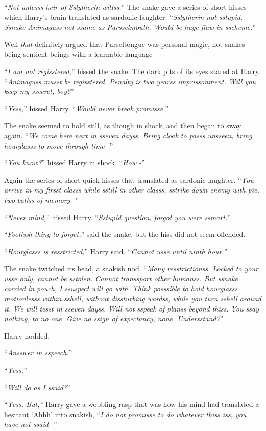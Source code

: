 ``\emph{Not unlesss heir of Sslytherin willss.}'' The snake gave a series of short hisses which Harry's brain translated as sardonic laughter. ``\emph{Sslytherin not sstupid. Ssnake Animaguss not ssame as Parsselmouth. Would be huge flaw in sscheme.}''

Well \emph{that} definitely argued that Parseltongue was personal magic, not snakes being sentient beings with a learnable language -

``\emph{I am not regisstered,}'' hissed the snake. The dark pits of its eyes stared at Harry. ``\emph{Animaguss musst be regisstered. Penalty is two yearss imprissonment. Will you keep my ssecret, boy?}''

``\emph{Yess,}'' hissed Harry. ``\emph{Would never break promisse.}''

The snake seemed to hold still, as though in shock, and then began to sway again. ``\emph{We come here next in sseven dayss. Bring cloak to passs unsseen, bring hourglasss to move through time -}''

``\emph{You know?}'' hissed Harry in shock. ``\emph{How -}''

Again the series of short quick hisses that translated as sardonic laughter. ``\emph{You arrive in my firsst classs while sstill in other classs, sstrike down enemy with pie, two ballss of memory -}''

``\emph{Never mind,}'' hissed Harry. ``\emph{Sstupid question, forgot you were ssmart.}''

``\emph{Foolissh thing to forget,}'' said the snake, but the hiss did not seem offended.

``\emph{Hourglasss is resstricted,}'' Harry said. ``\emph{Cannot usse until ninth hour.}''

The snake twitched its head, a snakish nod. ``\emph{Many resstrictionss. Locked to your usse only, cannot be sstolen. Cannot transsport other humanss. But ssnake carried in pouch, I ssuspect will go with. Think posssible to hold hourglasss motionlesss within sshell, without dissturbing wardss, while you turn sshell around it. We will tesst in sseven dayss. Will not sspeak of planss beyond thiss. You ssay nothing, to no one. Give no ssign of expectancy, none. Undersstand?}''

Harry nodded.

``\emph{Ansswer in sspeech.}''

``\emph{Yess.}''

``\emph{Will do as I ssaid?}''

``\emph{Yess. But,''} Harry gave a wobbling rasp that was how his mind had translated a hesitant `Ahhh' into snakish, ``\emph{I do not promisse to do whatever thiss iss, you have not ssaid -}''

